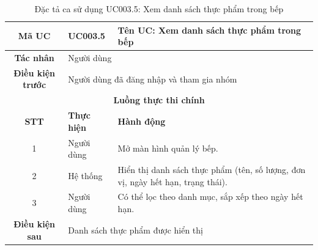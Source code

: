 \begin{table}[H]
    \centering
    \label{tab:uc003-5}
    \begin{tabularx}{\textwidth}{|c|p{3.5cm}|X|}
        \hline
        \rowcolor{headergreen} 
        \textbf{Mã UC} & \textbf{UC003.5} & \textbf{Tên UC: Xem danh sách thực phẩm trong bếp} \\ \hline
        \textbf{Tác nhân} & \multicolumn{2}{l|}{Người dùng} \\ \hline
        \textbf{Điều kiện trước} & \multicolumn{2}{X|}{Người dùng đã đăng nhập và tham gia nhóm} \\ \hline
        
        \multicolumn{3}{|c|}{\cellcolor{headerorange}\textbf{Luồng thực thi chính}} \\ \hline
        \rowcolor{graybg} \textbf{STT} & \textbf{Thực hiện} & \textbf{Hành động} \\ \hline
        1 & Người dùng & Mở màn hình quản lý bếp. \\ \hline
        2 & Hệ thống & Hiển thị danh sách thực phẩm (tên, số lượng, đơn vị, ngày hết hạn, trạng thái). \\ \hline
        3 & Người dùng & Có thể lọc theo danh mục, sắp xếp theo ngày hết hạn. \\ \hline
        
        \textbf{Điều kiện sau} & \multicolumn{2}{X|}{Danh sách thực phẩm được hiển thị} \\ \hline
    \end{tabularx}
    \caption{Đặc tả ca sử dụng UC003.5: Xem danh sách thực phẩm trong bếp}
\end{table}

